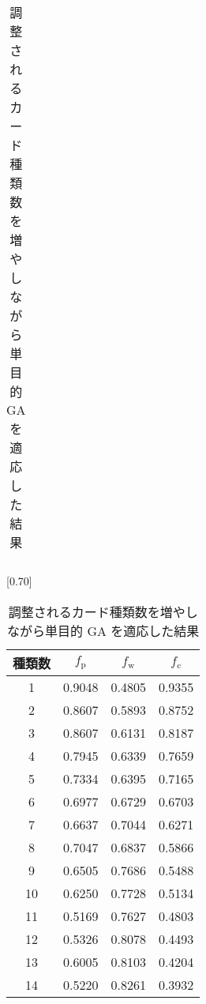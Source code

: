 \documentclass[twocolumn]{jarticle}
\begin{document}
\begin{table}[t]
\begin{minipage}{0.50\hsize}
{\begin{tabular}{|cc|cc|}
             \end{tabular}
         }
         \end{minipage}%
         \begin{minipage}{0.50\hsize}
           \centering
           \caption{調整されるカード種類数を増やしながら単目的 GA を適応した結果}
            \label{jikken3result}
            \vspace{-0.3cm}
           \scalebox{0.70}[0.70]{
                   \begin{tabular}{|c|c|c|c|}
                     \hline
                     種類数     & $f_\mathrm{p}$ & $f_\mathrm{w}$ & $f_\mathrm{c}$\\ \hline \hline
                     1              & 0.9048         & 0.4805 & 0.9355  \\ \hline
                     2           & 0.8607         & 0.5893 & 0.8752 \\ \hline
                     3        & 0.8607         & 0.6131 & 0.8187  \\ \hline
                     4    & 0.7945         & 0.6339 & 0.7659 \\ \hline
                     5 & 0.7334         & 0.6395  & 0.7165 \\ \hline
                     6 & 0.6977      & 0.6729  & 0.6703 \\ \hline
                     7& 0.6637   & 0.7044  & 0.6271 \\ \hline
                     8 & 0.7047 & 0.6837 & 0.5866 \\ \hline
                     9 & 0.6505 & 0.7686 & 0.5488\\ \hline
                     10 & 0.6250 & 0.7728  & 0.5134\\ \hline
                     11 & 0.5169 & 0.7627 & 0.4803\\ \hline
                     12 & 0.5326 & 0.8078 & 0.4493\\ \hline
                     13 & 0.6005 & 0.8103 & 0.4204\\ \hline
                     14 &  0.5220 &  0.8261 & 0.3932\\ \hline
                     \end{tabular}
                 }
         \end{minipage}
       \end{table}
     
\end{document}
